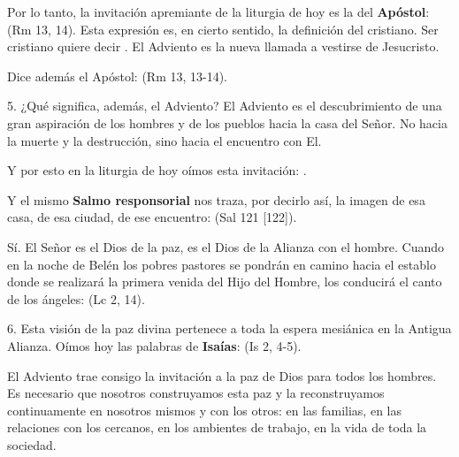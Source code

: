 Por lo tanto, la invitación apremiante de la liturgia de hoy es la del \textbf{Apóstol}:  (Rm 13, 14). Esta expresión es, en cierto sentido, la definición del cristiano. Ser cristiano quiere decir . El Adviento es la nueva llamada a vestirse de Jesucristo.

Dice además el Apóstol:  (Rm 13, 13-14).

5. ¿Qué significa, además, el Adviento? El Adviento es el descubrimiento de una gran aspiración de los hombres y de los pueblos hacia la casa del Señor. No hacia la muerte y la destrucción, sino hacia el encuentro con El.

Y por esto en la liturgia de hoy oímos esta invitación: .

Y el mismo \textbf{Salmo responsorial} nos traza, por decirlo así, la imagen de esa casa, de esa ciudad, de ese encuentro:  (Sal 121 {[}122{]}).

Sí. El Señor es el Dios de la paz, es el Dios de la Alianza con el hombre. Cuando en la noche de Belén los pobres pastores se pondrán en camino hacia el establo donde se realizará la primera venida del Hijo del Hombre, los conducirá el canto de los ángeles:  (Lc 2, 14).

6. Esta visión de la paz divina pertenece a toda la espera mesiánica en la Antigua Alianza. Oímos hoy las palabras de \textbf{Isaías}:  (Is 2, 4-5).

El Adviento trae consigo la invitación a la paz de Dios para todos los hombres. Es necesario que nosotros construyamos esta paz y la reconstruyamos continuamente en nosotros mismos y con los otros: en las familias, en las relaciones con los cercanos, en los ambientes de trabajo, en la vida de toda la sociedad.

